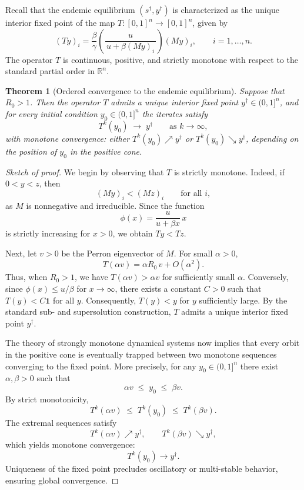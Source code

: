 \documentclass[final,3p,times,twocolumn]{elsarticle}
\newtheorem{theorem}{Theorem}
\begin{document}
Recall that the endemic equilibrium $(s^\dagger,y^\dagger)$ is characterized as
the unique interior fixed point of the map
$T:[0,1]^n \to [0,1]^n$, given by
\[
(Ty)_i
= \frac{\beta}{\gamma}
  \left(
      \frac{u}{\,u + \beta (My)_i\,}
  \right)
  (My)_i,
\qquad i=1,\dots,n.
\]
The operator $T$ is continuous, positive, and strictly monotone with respect to
the standard partial order in $\mathbb{R}^n$.

\begin{theorem}[Ordered convergence to the endemic equilibrium]
\label{thm:ordercontraction}
Suppose that $R_0>1$. Then the operator $T$ admits a unique interior fixed
point $y^\dagger\in(0,1]^n$, and for every initial condition $y_0\in (0,1]^n$
the iterates satisfy
\[
T^k(y_0)\;\longrightarrow\; y^\dagger
\qquad \text{as } k\to\infty,
\]
with monotone convergence: either $T^k(y_0)\nearrow y^\dagger$ or
$T^k(y_0)\searrow y^\dagger$, depending on the position of $y_0$ in the
positive cone.
\end{theorem}

\begin{proof}[Sketch of proof]
We begin by observing that $T$ is strictly monotone. Indeed, if $0<y<z$, then
\[
(My)_i < (Mz)_i \qquad \text{for all } i,
\]
as $M$ is nonnegative and irreducible. Since the function
\[
\phi(x)= \frac{u}{u+\beta x}\,x
\]
is strictly increasing for $x>0$, we obtain $Ty<Tz$.

Next, let $v>0$ be the Perron eigenvector of $M$. For small $\alpha>0$,
\[
T(\alpha v)
= \alpha R_0\, v + O(\alpha^2).
\]
Thus, when $R_0>1$, we have $T(\alpha v)>\alpha v$ for sufficiently small
$\alpha$. Conversely, since $\phi(x)\le u/\beta$ for $x\to\infty$, there exists
a constant $C>0$ such that $T(y) < C\mathbf{1}$ for all $y$. Consequently,
$T(y)<y$ for $y$ sufficiently large. By the standard sub- and supersolution
construction, $T$ admits a unique interior fixed point $y^\dagger$.

The theory of strongly monotone dynamical systems
\cite{Hirsch1985,Smith1995} now implies that every orbit in the positive cone
is eventually trapped between two monotone sequences converging to the fixed
point. More precisely, for any $y_0\in (0,1]^n$ there exist $\alpha,\beta>0$
such that
\[
\alpha v \;\le\; y_0 \;\le\; \beta v.
\]
By strict monotonicity,
\[
T^k(\alpha v) \;\le\; T^k(y_0) \;\le\; T^k(\beta v).
\]
The extremal sequences satisfy
\[
T^k(\alpha v)\nearrow y^\dagger,
\qquad
T^k(\beta v)\searrow y^\dagger,
\]
which yields monotone convergence:
\[
T^k(y_0)\longrightarrow y^\dagger.
\]
Uniqueness of the fixed point precludes oscillatory or multi-stable behavior,
ensuring global convergence.
\end{proof}
\end{document}
